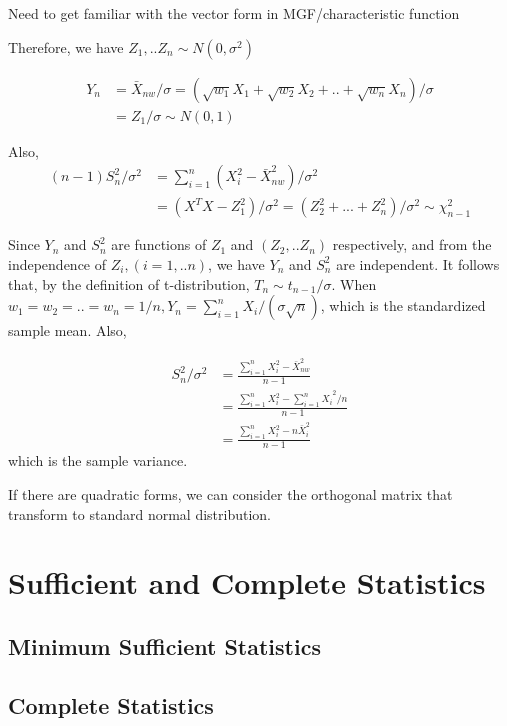 \documentclass[11pt]{article} %
\begin{document}
Need to get familiar with the vector form in MGF/characteristic function

Therefore, we have $Z_1, .. Z_n \sim N(0, \sigma^2)$ 

\begin{align*}
	Y_n &= \bar{X}_{nw}/\sigma = (\sqrt{w_1} X_1 + \sqrt{w_2} X_2 + .. + \sqrt{w_n} X_n)/\sigma\\
	&= Z_1/\sigma \sim N(0,1)
\end{align*}

Also, 
\begin{align*}
	(n-1) S_n^2/\sigma^2 &= \sum_{i=1}^n (X_i^2 - \bar{X}_{nw}^2)/\sigma^2 \\
	&= (X^T X - Z_1^2)/\sigma^2 = (Z_2^2 + ... + Z_n^2)/\sigma^2 \sim \chi^2_{n-1}
\end{align*}

Since $Y_n$ and $S_n^2$ are functions of $Z_1$ and $(Z_2,.. Z_n)$ respectively, and from the independence of $Z_i, (i=1,..n)$, we have $Y_n$ and $S_n^2$ are independent. It follows that, by the definition of t-distribution, $T_n \sim t_{n-1}/\sigma$. When $w_1=w_2=..=w_n=1/n, Y_n = \sum_{i=1}^n X_i/(\sigma \sqrt{n})$, which is the standardized sample mean. Also,

\begin{align*}
	S_n^2/\sigma^2 &= \frac{\sum_{i=1}^n X_i^2 - \bar{X}_{nw}^2 }{n-1} \\
	&= \frac{\sum_{i=1}^n X_i^2 - {\sum_{i=1}^n X_i}^2/n }{n-1}\\
	&= \frac{\sum_{i=1}^n X_i^2 -  n\bar{X}_i^2 }{n-1}
\end{align*} 	   
which is the sample variance.


If there are quadratic forms, we can consider the orthogonal matrix that transform to standard normal distribution.

\section{Sufficient and Complete Statistics}


\subsection{Minimum Sufficient Statistics}


\subsection{Complete Statistics}
\end{document}
